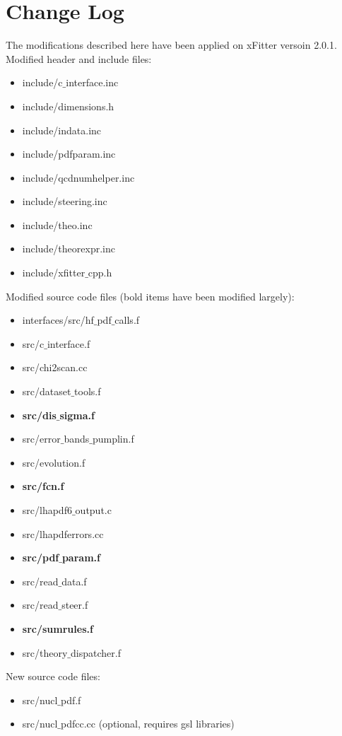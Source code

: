 \documentclass{article}
\begin{document}
\section{Change Log}

The modifications described here have been applied on xFitter versoin 2.0.1.\\

Modified header and include files:
\begin{itemize}
\item include/c$\_$interface.inc
\item include/dimensions.h
\item include/indata.inc
\item include/pdfparam.inc
\item include/qcdnumhelper.inc
\item include/steering.inc
\item include/theo.inc
\item include/theorexpr.inc
\item include/xfitter$\_$cpp.h
\end{itemize}

\vskip 0.2in
\noindent Modified source code files (bold items have been modified largely):
\begin{itemize}
\item interfaces/src/hf$\_$pdf$\_$calls.f
\item src/c$\_$interface.f
\item src/chi2scan.cc
\item src/dataset$\_$tools.f
\item \textbf{src/dis$\_$sigma.f}
\item src/error$\_$bands$\_$pumplin.f
\item src/evolution.f
\item \textbf{src/fcn.f}
\item src/lhapdf6$\_$output.c
\item src/lhapdferrors.cc
\item \textbf{src/pdf$\_$param.f}
\item src/read$\_$data.f
\item src/read$\_$steer.f
\item \textbf{src/sumrules.f}
\item src/theory$\_$dispatcher.f
\end{itemize}

\vskip 0.2in
\noindent New source code files:
\begin{itemize}
\item src/nucl$\_$pdf.f
\item src/nucl$\_$pdfcc.cc (optional, requires gsl libraries)
\end{itemize}
\end{document}
